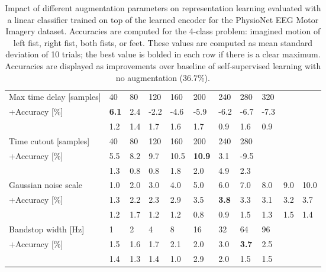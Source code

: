 \documentclass{article}
\newcommand{\std}[1]{{\scriptsize{#1}}}
\begin{document}
\begin{table}
  \centering
  \caption{Impact of different augmentation parameters on representation
  learning evaluated with a linear classifier trained on top of the learned
  encoder for the PhysioNet EEG Motor Imagery dataset. Accuracies are computed
  for the 4-class problem: imagined motion of left fist, right fist, both fists,
  or feet. These values are computed as mean  standard deviation of 10
  trials; the best value is bolded in each row if there is a clear maximum.
  Accuracies are displayed as improvements over baseline of self-supervised
  learning with no augmentation (36.7\%).}
  \label{table:eeg:augmentations}
  \small
  \begin{tabular}{l|llllllllll}
\toprule
Max time delay [samples]
    & 40 & 80 & 120 & 160 & 200 & 240 & 280 & 320 \\
    \hspace{5pt}+Accuracy [\%]
    & \textbf{6.1} & 2.4 & -2.2 & -4.6 & -5.9 & -6.2 & -6.7 & -7.3 \\
    & \std{1.2} & \std{1.4} & \std{1.7} & \std{1.6} & \std{1.7} & \std{0.9} & \std{1.6} & \std{0.9} \\
    \midrule

Time cutout [samples] & 40 & 80 & 120 & 160 & 200 & 240 & 280 \\
    \hspace{5pt}+Accuracy [\%]
    & 5.5 & 8.2 & 9.7 & 10.5 & \textbf{10.9} & 3.1 & -9.5 \\
    & \std{1.3} & \std{0.8} & \std{0.8} & \std{1.8} & \std{2.0} & \std{4.9} & \std{2.3} \\
    \midrule

Gaussian noise scale
    & 1.0 & 2.0 & 3.0 & 4.0 & 5.0 & 6.0 & 7.0 & 8.0 & 9.0 & 10.0 \\
    \hspace{5pt}+Accuracy [\%]
    & 1.3 & 2.2 & 2.3 & 2.9 & 3.5 & \textbf{3.8} & 3.3 & 3.1 & 3.2 & 3.7 \\
    & \std{1.2} & \std{1.7} & \std{1.2} & \std{1.2} & \std{0.8} & \std{0.9} & \std{1.5} & \std{1.3} & \std{1.5} & \std{1.4} \\
    \midrule

Bandstop width [Hz]
    & 1 & 2 & 4 & 8 & 16 & 32 & 64 & 96 \\
    \hspace{5pt}+Accuracy [\%]
    & 1.5 & 1.6 & 1.7 & 2.1 & 2.0 & 3.0 & \textbf{3.7} & 2.5 \\
    & \std{1.4} & \std{1.3} & \std{1.4} & \std{1.0} & \std{2.9} & \std{2.0} & \std{1.5} & \std{1.5} \\


\end{tabular}
\end{table}
\end{document}
